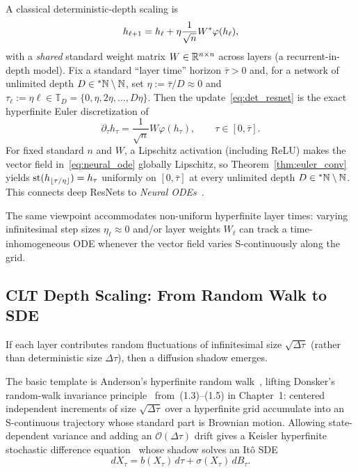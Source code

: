 A classical deterministic-depth scaling is
\begin{equation}\label{eq:det_resnet}
h_{\ell+1} = h_\ell + \eta \frac{1}{\sqrt{n}} W {}^*\varphi(h_\ell),
\end{equation}
with a \emph{shared} standard weight matrix $W \in \mathbb{R}^{n \times n}$ across layers (a recurrent-in-depth model). Fix a standard ``layer time'' horizon $\bar{\tau} > 0$ and, for a network of unlimited depth $D \in {}^*\mathbb{N} \setminus \mathbb{N}$, set $\eta := \bar{\tau}/D \approx 0$ and $\tau_\ell := \eta\ell \in \mathbb{T}_D = \{0, \eta, 2\eta, \dots, D\eta\}$. Then the update~\eqref{eq:det_resnet} is the exact hyperfinite Euler discretization of
\begin{equation}\label{eq:neural_ode}
\partial_\tau h_\tau = \frac{1}{\sqrt{n}} W \varphi(h_\tau), \qquad \tau \in [0, \bar{\tau}].
\end{equation}
For fixed standard $n$ and $W$, a Lipschitz activation (including ReLU) makes the vector field in~\eqref{eq:neural_ode} globally Lipschitz, so Theorem~\ref{thm:euler_conv} yields $\operatorname{st}(h_{\lfloor \tau/\eta \rfloor}) = h_\tau$ uniformly on $[0, \bar{\tau}]$ at every unlimited depth $D \in {}^*\mathbb{N} \setminus \mathbb{N}$. This connects deep ResNets to \emph{Neural ODEs}~\cite{chen2018neural}.

The same viewpoint accommodates non-uniform hyperfinite layer times: varying infinitesimal step sizes $\eta_\ell \approx 0$ and/or layer weights $W_\ell$ can track a time-inhomogeneous ODE whenever the vector field varies S-continuously along the grid.

\subsection{CLT Depth Scaling: From Random Walk to SDE}\label{subsec:clt_resnet}

If each layer contributes random fluctuations of infinitesimal size $\sqrt{\Delta\tau}$ (rather than deterministic size $\Delta\tau$), then a diffusion shadow emerges.

The basic template is Anderson's hyperfinite random walk~\cite{anderson1976nonstandard}, lifting Donsker's random-walk invariance principle~\cite{donsker1951invariance} from~(1.3)--(1.5) in Chapter~1: centered independent increments of size $\sqrt{\Delta\tau}$ over a hyperfinite grid accumulate into an S-continuous trajectory whose standard part is Brownian motion. Allowing state-dependent variance and adding an $\mathcal{O}(\Delta\tau)$ drift gives a Keisler hyperfinite stochastic difference equation~\cite{keisler1984infinitesimal,lindstrom1988invitation} whose shadow solves an It\^o SDE
\begin{equation}\label{eq:general_sde}
dX_\tau = b(X_\tau)\,d\tau + \sigma(X_\tau)\,dB_\tau.
\end{equation}

